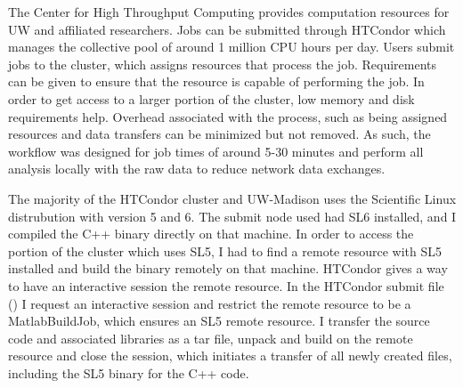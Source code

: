 The Center for High Throughput Computing provides computation resources for UW and affiliated researchers.  Jobs can be submitted through HTCondor \cite{beowulfbook-condor} which manages the collective pool of around 1 million CPU hours per day.  Users submit jobs to the cluster, which assigns resources that process the job.  Requirements can be given to ensure that the resource is capable of performing the job.  In order to get access to a larger portion of the cluster, low memory and disk requirements help.  Overhead associated with the process, such as being assigned resources and data transfers can be minimized but not removed. As such, the workflow was designed for job times of around 5-30 minutes and perform all analysis locally with the raw data to reduce network data exchanges.

The majority of the HTCondor cluster and UW-Madison uses the Scientific Linux distrubution with version 5 and 6.  The submit node used had SL6 installed, and I compiled the C++ binary directly on that machine.  In order to access the portion of the cluster which uses SL5, I had to find a remote resource with SL5 installed and build the binary remotely on that machine.  HTCondor gives a way to have an interactive session the remote resource.  In the HTCondor submit file () I request an interactive session and restrict the remote resource to be a MatlabBuildJob, which ensures an SL5 remote resource.  I transfer the source code and associated libraries as a tar file, unpack and build on the remote resource and close the session, which initiates a transfer of all newly created files, including the SL5 binary for the C++ code.

\linespread{1}

\linespread{2}



